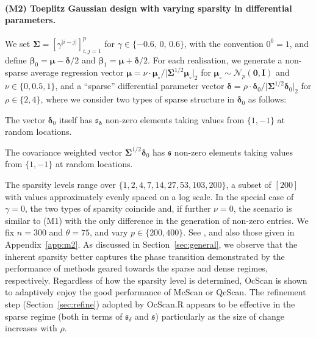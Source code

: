 \documentclass[11pt, a4paper]{article}
\newcommand{\mbf}{\mathbf}
\newcommand{\mc}{\mathcal}
\newcommand{\cp}{\theta}
\theoremstyle{definition}
\theoremstyle{definition}
\theoremstyle{definition}
\theoremstyle{definition}
\theoremstyle{definition}
\theoremstyle{remark}
\theoremstyle{definition}
\theoremstyle{definition}
\theoremstyle{definition}
\begin{document}
\paragraph{(M2) Toeplitz Gaussian design with varying sparsity in differential parameters.} 
We set $\bm\Sigma = [\gamma^{\vert i - j \vert}]_{i, j = 1}^p$ for $\gamma \in \{-0.6,\, 0,\, 0.6\}$, with the convention $0^0 = 1$, and define $\bm\beta_0 = \bm\mu - \bm\delta/2$ and $\bm\beta_1 = \bm\mu + \bm\delta/2$. For each realisation, we generate a non-sparse average regression vector $\bm\mu = \nu \cdot \bm\mu_\circ / \vert\bm\Sigma^{1/2}\bm\mu_\circ\vert_2$ for $\bm\mu_\circ \sim \mc N_p(\mbf 0, \mbf I)$ and $\nu \in \{0,0.5,1\}$,  and a \enquote{sparse} differential parameter vector $\bm\delta = \rho \cdot \bm\delta_0/\vert \bm\Sigma^{1/2}\bm\delta_0\vert_2$ for $\rho \in \{2, 4\}$, where we consider two types of sparse structure in $\bm\delta_0$ as follows: 
\begin{description}[wide, leftmargin=0pt]
\item[Standard sparsity.] The vector $\bm\delta_0$ itself has $\mathfrak{s}_{\bm\delta}$ non-zero elements taking values from $\{1, - 1\}$ at random locations.
\item[Inherent sparsity.] The covariance weighted vector $\bm\Sigma^{1/2}\bm\delta_0$ has $\mathfrak{s}$ non-zero elements taking values from $\{1, - 1\}$ at random locations.
\end{description}
The sparsity levels range over $ \{1,  2,  4,  7, 14,  27,  53, 103, 200\}$, a subset of $[200]$ with values approximately evenly spaced on a log scale. In the special case of $\gamma = 0$, the two types of sparsity coincide and, if further $\nu = 0$, the scenario is similar to (M1) with the only difference in the generation of non-zero entries. 
We fix $n = 300$ and $\cp = 75$, and vary $p \in \{200, 400\}$. See , and also those given in Appendix~\ref{app:m2}. %
As discussed in Section~\ref{sec:general}, we observe that the inherent sparsity better captures the phase transition demonstrated by the performance of methods geared towards the sparse and dense regimes, respectively.
Regardless of how the sparsity level is determined, OcScan is shown to adaptively enjoy the good performance of McScan or QcScan. %
The refinement step (Section~\ref{sec:refine}) adopted by OcScan.R appears to be effective in the sparse regime (both in terms of $\mathfrak{s}_\delta$ and $\mathfrak{s}$) particularly as the size of change increases with $\rho$.
\end{document}
